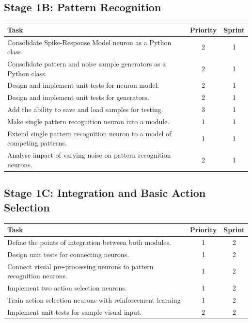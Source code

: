 \documentclass[a4paper,11pt]{article}
\begin{document}
\subsection{Stage 1B: Pattern Recognition}
\begin{center}
    \begin{tabular}{p{12cm} c c}
    \textbf{Task} & \textbf{Priority} & \textbf{Sprint} \\ \hline
	Consolidate Spike-Response Model neuron as a Python class. & 2 & 1 \\
	Consolidate pattern and noise sample generators as a Python class. & 2 & 1 \\
	Design and implement unit tests for neuron model. & 2 & 1 \\
	Design and implement unit tests for generators. & 2 & 1 \\
	Add the ability to save and load samples for testing. & 3 & 1 \\
	Make single pattern recognition neuron into a module. & 1 & 1 \\
	Extend single pattern recognition neuron to a model of competing patterns. & 1 & 1 \\
	Analyse impact of varying noise on pattern recognition neurons. & 2 & 1 \\
    \end{tabular}
\end{center}

\subsection{Stage 1C: Integration and Basic Action Selection}
\begin{center}
    \begin{tabular}{p{12cm} c c}
    \textbf{Task} & \textbf{Priority} & \textbf{Sprint} \\ \hline
	Define the points of integration between both modules. & 1 & 2 \\
	Design unit tests for connecting neurons. & 1 & 2 \\    
	Connect visual pre-processing neurons to pattern recognition neurons. & 1 & 2 \\
	Implement two action selection neurons. & 1 & 2\\
	Train action selection neurons with reinforcement learning & 1 & 2\\    
	Implement unit tests for sample visual input. & 2 & 2 \\
    \end{tabular}
\end{center}
\end{document}
